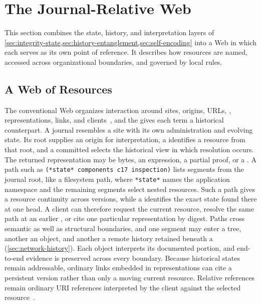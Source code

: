 \section{The Journal-Relative Web}
\label{sec:journal-web}

This section combines the state, history, and interpretation layers of \cref{sec:integrity-state,sec:history-entanglement,sec:self-encoding} into a Web in which each  serves as its own point of reference. It describes how resources are named, accessed across organizational boundaries, and governed by local rules.

\subsection{A Web of Resources}

The conventional Web organizes interaction around sites, origins, URLs, , representations, links, and clients~\cite{Jacobs2004webarch,BernersLee2005uri}, and the  gives each term a historical counterpart. A journal resembles a site with its own administration and evolving state. Its root supplies an origin for interpretation, a  identifies a resource from that root, and a committed  selects the historical view in which resolution occurs. The returned representation may be bytes, an expression, a partial proof, or a  . A path such as \texttt{(*state* components c17 inspection)} lists segments from the journal root, like a filesystem path, where \texttt{*state*} names the application namespace and the remaining segments select nested resources. Such a path gives a resource continuity across versions, while a  identifies the exact state found there at one head. A client can therefore request the current resource, resolve the same path at an earlier , or cite one particular representation by digest. Paths cross semantic as well as structural boundaries, and one segment may enter a tree, another an object, and another a remote history retained beneath a  (\cref{sec:network-history}). Each object interprets its documented portion, and end-to-end evidence is preserved across every boundary. Because historical states remain addressable, ordinary links embedded in representations can cite a persistent version rather than only a moving current resource. Relative references remain ordinary URI references interpreted by the client against the selected resource~\cite{Rivest1996sdsi,Mazieres1998path}.

